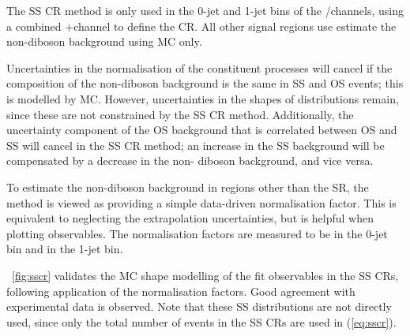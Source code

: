 The SS CR method is only used in the 0-jet and 1-jet bins of the \emch/\mech channels, 
using a combined \emch{}+\mech channel to define the CR. All other signal regions use 
estimate the non-\WW diboson background using MC only.

Uncertainties in the normalisation of the constituent processes will cancel if the 
composition of the non-\WW diboson background is the same in SS and OS events; this is 
modelled by MC. However, uncertainties in the shapes of distributions remain, since these 
are not constrained by the SS CR method. Additionally, the uncertainty component of the OS 
\Wjets background that is correlated between OS and SS will cancel in the SS CR method; an 
increase in the SS \Wjets background will be compensated by a decrease in the non-\WW 
diboson background, and vice versa.

To estimate the non-\WW diboson background in regions other than the SR, the method is 
viewed as providing a simple data-driven normalisation factor. This is equivalent to 
neglecting the extrapolation uncertainties, but is helpful when plotting observables. The 
normalisation factors are measured to be  in the 0-jet bin and 
 in the 1-jet bin. 

\Figure~\ref{fig:sscr} validates the MC shape modelling of the fit observables in the SS 
CRs, following application of the normalisation factors. Good agreement with experimental 
data is observed. Note that these SS distributions are not directly used, since only the 
total number of events in the SS CRs are used in (\ref{eq:sscr}).

